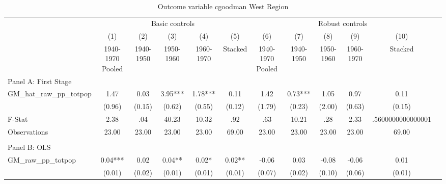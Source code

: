 \begin{table}[htbp]\centering {} \begin{threeparttable} \caption{Outcome variable cgoodman West Region} \begin{tabular}{l*{11}{c}} \toprule
          &\multicolumn{5}{c}{Basic controls}                                   &\multicolumn{5}{c}{Robust controls}                                  \\\cmidrule(lr){2-6}\cmidrule(lr){7-11}
          &\multicolumn{1}{c}{(1)}&\multicolumn{1}{c}{(2)}&\multicolumn{1}{c}{(3)}&\multicolumn{1}{c}{(4)}&\multicolumn{1}{c}{(5)}&\multicolumn{1}{c}{(6)}&\multicolumn{1}{c}{(7)}&\multicolumn{1}{c}{(8)}&\multicolumn{1}{c}{(9)}&\multicolumn{1}{c}{(10)}\\
          &\multicolumn{1}{c}{1940-1970 Pooled}&\multicolumn{1}{c}{1940-1950}&\multicolumn{1}{c}{1950-1960}&\multicolumn{1}{c}{1960-1970}&\multicolumn{1}{c}{Stacked}&\multicolumn{1}{c}{1940-1970 Pooled}&\multicolumn{1}{c}{1940-1950}&\multicolumn{1}{c}{1950-1960}&\multicolumn{1}{c}{1960-1970}&\multicolumn{1}{c}{Stacked}\\
\cmidrule(lr){1-11}
\multicolumn{10}{l}{Panel A: First Stage}\\
\cmidrule(lr){1-11}
GM\_hat\_raw\_pp\_totpop&      1.47   &      0.03   &      3.95***&      1.78***&      0.11   &      1.42   &      0.73***&      1.05   &      0.97   &      0.11   \\
          &    (0.96)   &    (0.15)   &    (0.62)   &    (0.55)   &    (0.12)   &    (1.79)   &    (0.23)   &    (2.00)   &    (0.63)   &    (0.15)   \\
\midrule
F-Stat    &      2.38   &       .04   &     40.23   &     10.32   &       .92   &       .63   &     10.21   &       .28   &      2.33   &.5600000000000001   \\
Observations&     23.00   &     23.00   &     23.00   &     23.00   &     69.00   &     23.00   &     23.00   &     23.00   &     23.00   &     69.00   \\
\cmidrule[\heavyrulewidth](lr){1-11} \\ \cmidrule[\heavyrulewidth](lr){1-11}
\multicolumn{10}{l}{Panel B: OLS}\\
\cmidrule(lr){1-11}
GM\_raw\_pp\_totpop&      0.04***&      0.02   &      0.04** &      0.02*  &      0.02** &     -0.06   &      0.03   &     -0.08   &     -0.06   &      0.01   \\
          &    (0.01)   &    (0.02)   &    (0.01)   &    (0.01)   &    (0.01)   &    (0.07)   &    (0.02)   &    (0.10)   &    (0.06)   &    (0.01)   \\

\end{tabular}
\end{threeparttable}
\end{table}
